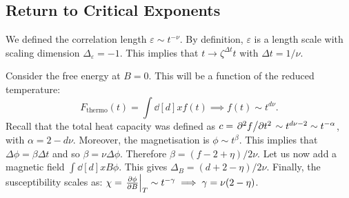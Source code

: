 \subsection{Return to Critical Exponents}%
\label{sub:return_to_critical_exponents}

We defined the correlation length $\varepsilon \sim t^{-\nu}$. By definition, $\varepsilon$ is a length scale with scaling dimension $\Delta_{\varepsilon} = -1$. This implies that $t \to \zeta^{\Delta t} t$ with $\Delta t = 1/\nu$.

Consider the free energy at $B = 0$. This will be a function of the reduced temperature:
\begin{equation}
  F_{\text{thermo}}(t) = \int \dd[d]{x} f(t) \implies f(t) \sim t^{d\nu}.
\end{equation}
Recall that the total heat capacity was defined as $c = \pdv*[2]{f}{t} \sim t^{d\nu - 2} \sim t^{-\alpha}$, with $\alpha = 2 - d \nu$.
Moreover, the magnetisation is $\phi \sim t^{\beta}$. This implies that $\Delta \phi = \beta \Delta t$ and so $\beta = \nu \Delta \phi$. Therefore $\beta = (f - 2 + \eta) / 2 \nu$.
Let us now add a magnetic field $\int \dd[d]{x} B \phi$. This gives $\Delta_B = (d + 2 - \eta)/2 \nu$. 
Finally, the susceptibility scales as: $\chi = \left.\pdv{\phi}{B}\right\rvert_{T} \sim t^{-\gamma} \implies \gamma = \nu (2 - \eta)$.
